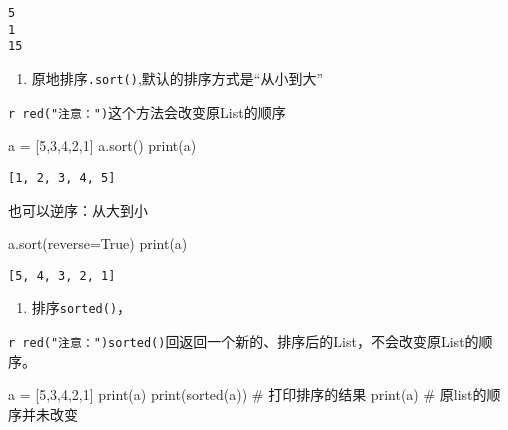 \documentclass[
  letterpaper,
  DIV=11,
  numbers=noendperiod]{scrreprt}
\newenvironment{Shaded}{\begin{snugshade}}{\end{snugshade}}
\newcommand{\BuiltInTok}[1]{\textcolor[rgb]{0.00,0.23,0.31}{#1}}
\newcommand{\CommentTok}[1]{\textcolor[rgb]{0.37,0.37,0.37}{#1}}
\newcommand{\DecValTok}[1]{\textcolor[rgb]{0.68,0.00,0.00}{#1}}
\newcommand{\NormalTok}[1]{\textcolor[rgb]{0.00,0.23,0.31}{#1}}
\newcommand{\OperatorTok}[1]{\textcolor[rgb]{0.37,0.37,0.37}{#1}}
\newcommand{\VariableTok}[1]{\textcolor[rgb]{0.07,0.07,0.07}{#1}}
\providecommand{\tightlist}{%
  \setlength{\itemsep}{0pt}\setlength{\parskip}{0pt}}\usepackage{longtable,booktabs,array}
\begin{document}
\begin{verbatim}
5
1
15
\end{verbatim}

\begin{enumerate}
\def\labelenumi{\arabic{enumi}.}
\setcounter{enumi}{2}
\tightlist
\item
  原地排序\texttt{.sort()},默认的排序方式是``从小到大''
\end{enumerate}

\texttt{r\ red("注意：")}这个方法会改变原List的顺序

\begin{Shaded}
\begin{Highlighting}[]
\NormalTok{a }\OperatorTok{=}\NormalTok{ [}\DecValTok{5}\NormalTok{,}\DecValTok{3}\NormalTok{,}\DecValTok{4}\NormalTok{,}\DecValTok{2}\NormalTok{,}\DecValTok{1}\NormalTok{]}
\NormalTok{a.sort()}
\BuiltInTok{print}\NormalTok{(a)}
\end{Highlighting}
\end{Shaded}

\begin{verbatim}
[1, 2, 3, 4, 5]
\end{verbatim}

也可以逆序：从大到小

\begin{Shaded}
\begin{Highlighting}[]
\NormalTok{a.sort(reverse}\OperatorTok{=}\VariableTok{True}\NormalTok{)}
\BuiltInTok{print}\NormalTok{(a)}
\end{Highlighting}
\end{Shaded}

\begin{verbatim}
[5, 4, 3, 2, 1]
\end{verbatim}

\begin{enumerate}
\def\labelenumi{\arabic{enumi}.}
\setcounter{enumi}{3}
\tightlist
\item
  排序\texttt{sorted()}，
\end{enumerate}

\texttt{r\ red("注意：")\textasciigrave{}\textasciigrave{}sorted()}回返回一个新的、排序后的List，不会改变原List的顺序。

\begin{Shaded}
\begin{Highlighting}[]
\NormalTok{a }\OperatorTok{=}\NormalTok{ [}\DecValTok{5}\NormalTok{,}\DecValTok{3}\NormalTok{,}\DecValTok{4}\NormalTok{,}\DecValTok{2}\NormalTok{,}\DecValTok{1}\NormalTok{]}
\BuiltInTok{print}\NormalTok{(a)}
\BuiltInTok{print}\NormalTok{(}\BuiltInTok{sorted}\NormalTok{(a)) }\CommentTok{\# 打印排序的结果}
\BuiltInTok{print}\NormalTok{(a) }\CommentTok{\# 原list的顺序并未改变}
\end{Highlighting}
\end{Shaded}
\end{document}
